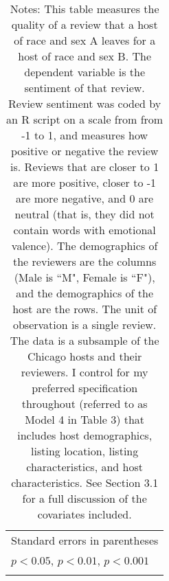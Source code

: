 \begin{sidewaystable}
{\begin{longtable}{l*{8}{c}}
\hline\hline
\multicolumn{9}{l}{\footnotesize Standard errors in parentheses}\\
\multicolumn{9}{l}{\footnotesize \sym{*} \(p<0.05\), \sym{**} \(p<0.01\), \sym{***} \(p<0.001\)}\\
\caption*{Notes: This table measures the quality of a review that a host of race and sex A leaves for a host of race and sex B. The dependent variable is the sentiment of that review. Review sentiment was coded by an R script on a scale from from -1 to 1, and measures how positive or negative the review is. Reviews that are closer to 1 are more positive, closer to -1 are more negative, and 0 are neutral (that is, they did not contain words with emotional valence). The demographics of the reviewers are the columns (Male is ``M", Female is ``F"), and the demographics of the host are the rows. The unit of observation is a single review. The data is a subsample of the Chicago hosts and their reviewers. I control for my preferred specification throughout (referred to as Model 4 in Table 3) that includes host demographics, listing location, listing characteristics, and host characteristics. See Section 3.1 for a full discussion of the covariates included.}
\end{longtable}
}
\end{sidewaystable}


